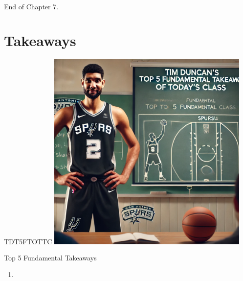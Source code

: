 \documentclass{beamer}
\begin{document}

\begin{frame}{}
     \centering
     \Huge End of Chapter 7.
\end{frame}

\section*{Takeaways}

\begin{frame}{TDT5FTOTTC}
    \centering
    \includegraphics[width=0.75\textwidth]{figures/tim.png}
\end{frame}

\begin{frame}{Top 5 Fundamental Takeaways}
    \small
    \begin{enumerate} \pause
        \item[5]
    \end{enumerate}
\end{frame}
\end{document}
